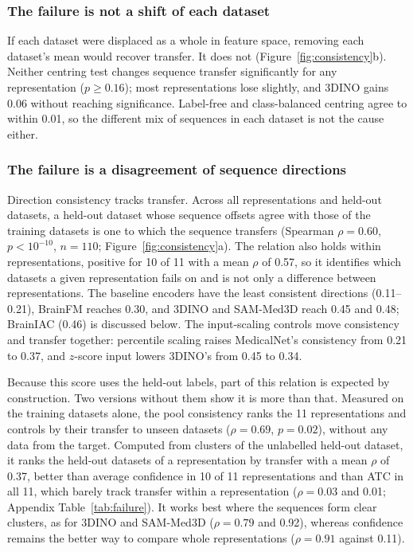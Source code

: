 \documentclass[11pt]{article}
\begin{document}
\subsubsection{The failure is not a shift of each dataset}

If each dataset were displaced as a whole in feature space, removing each
dataset's mean would recover transfer. It does not
(Figure~\ref{fig:consistency}b). Neither centring test changes sequence
transfer significantly for any representation ($p\ge0.16$); most
representations lose slightly, and 3DINO gains 0.06 without reaching
significance. Label-free and class-balanced centring agree to within 0.01,
so the different mix of sequences in each dataset is not the cause either.

\subsubsection{The failure is a disagreement of sequence directions}
\label{sec:consistency}

Direction consistency tracks transfer. Across all representations and held-out datasets, a held-out
dataset whose sequence offsets agree with those of the training datasets is
one to which the sequence transfers (Spearman $\rho=0.60$, $p<10^{-10}$,
$n=110$; Figure~\ref{fig:consistency}a). The relation also holds within
representations, positive for 10 of 11 with a mean $\rho$ of 0.57, so it
identifies which datasets a given representation fails on and is not only a
difference between representations. The baseline encoders have the least
consistent directions (0.11--0.21), BrainFM reaches 0.30, and 3DINO and
SAM-Med3D reach 0.45 and 0.48; BrainIAC (0.46) is discussed below. The input-scaling controls move
consistency and transfer together: percentile scaling raises MedicalNet's
consistency from 0.21 to 0.37, and $z$-score input lowers 3DINO's from 0.45
to 0.34.

Because this score uses the held-out labels, part of this relation is
expected by construction. Two versions without them show it is more than
that. Measured on the training datasets alone, the pool consistency ranks the 11 representations and controls by their transfer to
unseen datasets ($\rho=0.69$, $p=0.02$), without any data from the target.
Computed from clusters of the unlabelled held-out dataset, it ranks the
held-out datasets of a representation by transfer with a mean $\rho$ of 0.37,
better than average confidence in 10 of 11 representations and than ATC in all
11, which barely track transfer within a representation ($\rho=0.03$ and 0.01;
Appendix Table~\ref{tab:failure}). It works best where the sequences form
clear clusters, as for 3DINO and SAM-Med3D ($\rho=0.79$ and 0.92), whereas
confidence remains the better way to compare whole representations ($\rho=0.91$
against 0.11).
\end{document}
